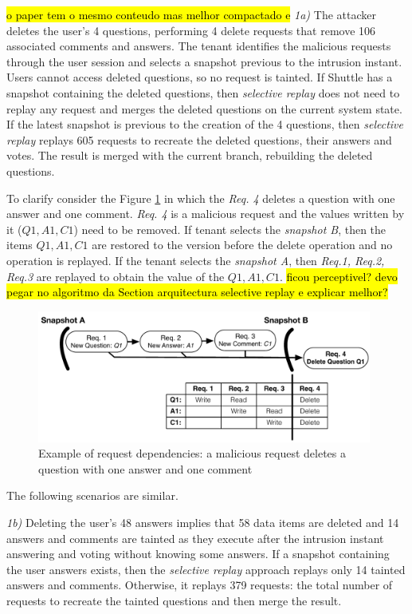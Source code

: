 \hl{o paper tem o mesmo conteudo mas melhor compactado e }
\textit{1a)} 
The attacker deletes the user's 4 questions, performing 4 delete requests that remove 106 associated comments and answers. 
The tenant identifies the malicious requests through the user session and selects a snapshot previous to the intrusion instant. Users cannot access deleted questions, so no request is tainted. 
If Shuttle has a snapshot containing the deleted questions, then \textit{selective replay} does not need to replay any request and merges the deleted questions on the current system state. If the latest snapshot is previous to the creation of the 4 questions, then \textit{selective replay} replays 605 requests to recreate the deleted questions, their answers and votes. The result is merged with the current branch, rebuilding the deleted questions. 

To clarify consider the Figure \ref{fig:attack_1_graph} in which the \emph{Req. 4} deletes a question with one answer and one comment. \emph{Req. 4} is a malicious request and the values written by it ($Q1, A1, C1$) need to be removed. If tenant selects the \emph{snapshot B}, then the items $Q1, A1, C1$ are restored to the version before the delete operation and no operation is replayed. If the tenant selects the \emph{snapshot A}, then \emph{Req.1, Req.2, Req.3} are replayed to obtain the value of the $Q1, A1, C1$. \hl{ficou perceptivel? devo pegar no algoritmo da Section arquitectura selective replay e explicar melhor? }

\begin{figure}
  \centering
  \includegraphics[width=110mm]{images/attack_1_graph}
  \caption[Example of request dependencies]{Example of request dependencies: a malicious request deletes a question with one answer and one comment}
  \label{fig:attack_1_graph}
\end{figure}

The following scenarios are similar.

\textit{1b)} Deleting the user's 48 answers implies that 58 data items are deleted and 14 answers and comments are tainted as they execute after the intrusion instant answering and voting without knowing some answers. If a snapshot containing the user answers exists, then the \textit{selective replay} approach replays only 14 tainted answers and comments. Otherwise, it replays 379 requests: the total number of requests to recreate the tainted questions and then merge the result.

